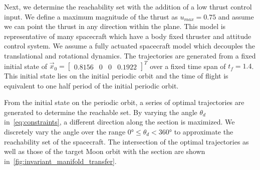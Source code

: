 \documentclass[preprint]{elsarticle}
\begin{document}
Next, we determine the reachability set with the addition of a low thrust control input.
We define a maximum magnitude of the thrust as \( u_{max} = 0.75 \) and assume we can point the thrust in any direction within the plane. 
This model is representative of many spacecraft which have a body fixed thruster and attitude control system.
We assume a fully actuated spacecraft model which decouples the translational and rotational dynamics.
The trajectories are generated from a fixed initial state of \( \vec{x}_0 = \begin{bmatrix}0.8156 & 0 & 0 & 0.1922 \end{bmatrix}^T \) over a fixed time span of \( t_f = 1.4 \).
This initial state lies on the initial periodic orbit and the time of flight is equivalent to one half period of the initial periodic orbit. 

From the initial state on the periodic orbit, a series of optimal trajectories are generated to determine the reachable set.
By varying the angle \( \theta_d\) in~\cref{eq:constraints}, a different direction along the \Poincare section is maximized. 
We discretely vary the angle over the range \( \ang{0} \leq \theta_d < \ang{360} \) to approximate the reachability set of the spacecraft.
The intersection of the optimal trajectories as well as those of the target Moon orbit with the \Poincare section are shown in~\cref{fig:invariant_manifold_transfer}.
\end{document}
